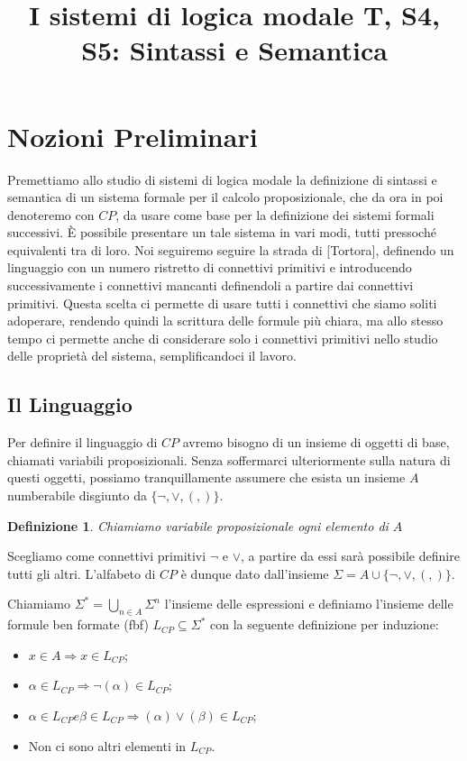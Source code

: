 \documentclass[a4paper, 12pt]{article}
\title{I sistemi di logica modale T, S4, S5: Sintassi e Semantica}
\date{}
\newtheorem{definition}{Definizione}
\begin{document}
\maketitle
\section{Nozioni Preliminari}
Premettiamo allo studio di sistemi di logica modale la definizione
di sintassi e semantica di un sistema formale per il calcolo proposizionale,
che da ora in poi denoteremo con $CP$, da usare come base per la definizione
dei sistemi formali successivi.
È possibile presentare un tale sistema in vari modi, tutti pressoché equivalenti tra di loro.
Noi seguiremo seguire la strada di [Tortora], definendo un linguaggio con un numero ristretto
di connettivi primitivi e introducendo successivamente i connettivi mancanti definendoli a partire
dai connettivi primitivi.
Questa scelta ci permette di usare tutti i connettivi che siamo soliti adoperare,
rendendo quindi la scrittura delle formule più chiara, ma allo stesso tempo ci permette anche di
considerare solo i connettivi primitivi nello studio delle proprietà del sistema,
semplificandoci il lavoro.

\subsection{Il Linguaggio}
Per definire il linguaggio di $CP$ avremo bisogno di un insieme di oggetti di base,
chiamati variabili proposizionali. Senza soffermarci ulteriormente sulla natura di questi oggetti,
possiamo tranquillamente assumere che esista un insieme $A$ numberabile
disgiunto da $\{\neg, \lor, (, )\}$.

\begin{definition}
Chiamiamo variabile proposizionale ogni elemento di $A$
\end{definition}

Scegliamo come connettivi primitivi $\neg$ e $\lor$,
a partire da essi sarà possibile definire tutti gli altri.
L'alfabeto di $CP$ è dunque dato dall'insieme $\Sigma = A \cup \{\neg, \lor, (, )\}$.

Chiamiamo $\Sigma^{*} = \bigcup_{n \in A} \Sigma^n$ l'insieme delle espressioni
e definiamo l'insieme delle formule ben formate (fbf) $L_{CP} \subseteq \Sigma^{*}$ con la seguente definizione
per induzione:
\begin{itemize}
\item $x \in A \Rightarrow x \in L_{CP}$;
\item $\alpha \in L_{CP} \Rightarrow \neg (\alpha) \in L_{CP}$;
\item $\alpha \in L_{CP} e \beta \in L_{CP} \Rightarrow (\alpha) \lor (\beta) \in L_{CP}$;
\item Non ci sono altri elementi in $L_{CP}$.
\end{itemize}
\end{document}
